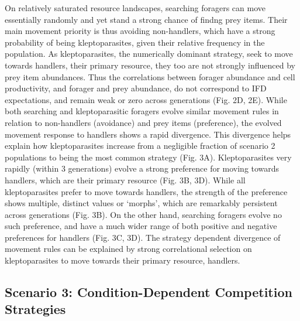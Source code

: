 \documentclass[11pt]{article}
\begin{document}
On relatively saturated resource landscapes, searching foragers can move essentially randomly and yet stand a strong chance of findng prey items.
Their main movement priority is thus avoiding non-handlers, which have a strong probability of being kleptoparasites, given their relative frequency in the population.
As kleptoparasites, the numerically dominant strategy, seek to move towards handlers, their primary resource, they too are not strongly influenced by prey item abundances.
Thus the correlations between forager abundance and cell productivity, and forager and prey abundance, do not correspond to IFD expectations, and remain weak or zero across generations (Fig. 2D, 2E).
While both searching and kleptoparasitic foragers evolve similar movement rules in relation to non-handlers (avoidance) and prey items (preference), the evolved movement response to handlers shows a rapid divergence.
This divergence helps explain how kleptoparasites increase from a negligible fraction of scenario 2 populations to being the most common strategy (Fig. 3A).
Kleptoparasites very rapidly (within 3 generations) evolve a strong preference for moving towards handlers, which are their primary resource (Fig. 3B, 3D).
While all kleptoparasites prefer to move towards handlers, the strength of the preference shows multiple, distinct values or `morphs', which are remarkably persistent across generations (Fig. 3B).
On the other hand, searching foragers evolve no such preference, and have a much wider range of both positive and negative preferences for handlers (Fig. 3C, 3D).
The strategy dependent divergence of movement rules can be explained by strong correlational selection on kleptoparasites to move towards their primary resource, handlers.

\subsection{Scenario 3: Condition-Dependent Competition Strategies}
\end{document}
